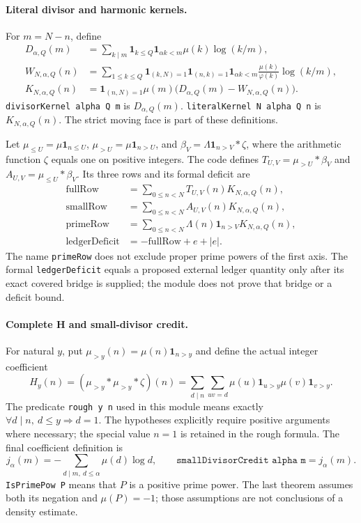 \documentclass[11pt,a4paper]{article}
\theoremstyle{definition}
\theoremstyle{remark}
\newcommand{\muMob}{\mu}
\newcommand{\Lam}{\Lambda}
\newcommand{\ph}{\varphi}
\begin{document}
\paragraph{Literal divisor and harmonic kernels.}
For \(m=N-n\), define
\begin{align*}
 D_{\alpha,Q}(m)
 &=\sum_{k\mid m}\mathbf1_{k\le Q}\mathbf1_{\alpha k<m}
       \muMob(k)\log(k/m),\\
 W_{N,\alpha,Q}(n)
 &=\sum_{1\le k\le Q}\mathbf1_{(k,N)=1}\mathbf1_{(n,k)=1}
       \mathbf1_{\alpha k<m}\frac{\muMob(k)}{\ph(k)}\log(k/m),\\
 K_{N,\alpha,Q}(n)
 &=\mathbf1_{(n,N)=1}\muMob(m)
       \bigl(D_{\alpha,Q}(m)-W_{N,\alpha,Q}(n)\bigr).
\end{align*}
\texttt{divisorKernel alpha Q m} is \(D_{\alpha,Q}(m)\).
\texttt{literalKernel N alpha Q n} is \(K_{N,\alpha,Q}(n)\).
The strict moving face is part of these definitions.

Let \(\mu_{\le U}=\muMob\mathbf1_{n\le U}\),
\(\mu_{>U}=\muMob\mathbf1_{n>U}\), and
\(\beta_V=\Lam\mathbf1_{n>V}*\zeta\), where the arithmetic
function \(\zeta\) equals one on positive integers.
The code defines
\(T_{U,V}=\mu_{>U}*\beta_V\) and
\(A_{U,V}=\mu_{\le U}*\beta_V\).
Its three rows and its formal deficit are
\begin{align*}
 \mathrm{fullRow}&=\sum_{0\le n<N}T_{U,V}(n)K_{N,\alpha,Q}(n),\\
 \mathrm{smallRow}&=\sum_{0\le n<N}A_{U,V}(n)K_{N,\alpha,Q}(n),\\
 \mathrm{primeRow}&=\sum_{0\le n<N}\Lam(n)\mathbf1_{n>V}
                           K_{N,\alpha,Q}(n),\\
 \mathrm{ledgerDeficit}&=-\mathrm{fullRow}+e+|e|.
\end{align*}
The name \texttt{primeRow} does not exclude proper prime powers of
the first axis. The formal \texttt{ledgerDeficit} equals a proposed
external ledger quantity only after its exact covered bridge is supplied;
the module does not prove that bridge or a deficit bound.

\paragraph{Complete H and small-divisor credit.}
For natural \(y\), put \(\mu_{>y}(n)=\muMob(n)\mathbf1_{n>y}\)
and define the actual integer coefficient
\[
 H_y(n)=(\mu_{>y}*\mu_{>y}*\zeta)(n)
   =\sum_{d\mid n}\sum_{uv=d}
       \muMob(u)\mathbf1_{u>y}\muMob(v)\mathbf1_{v>y}.
\]
The predicate \texttt{rough y n} used in this module means exactly
\(\forall d\mid n,\ d\le y\Rightarrow d=1\).
The hypotheses explicitly require positive arguments where necessary;
the special value \(n=1\) is retained in the rough formula.
The final coefficient definition is
\[
 j_\alpha(m)=-\sum_{d\mid m,\ d\le\alpha}\muMob(d)\log d,
 \qquad
 \texttt{smallDivisorCredit alpha m}=j_\alpha(m).
\]
\texttt{IsPrimePow P} means that \(P\) is a positive prime power.
The last theorem assumes both its negation and \(\muMob(P)=-1\);
those assumptions are not conclusions of a density estimate.
\end{document}
